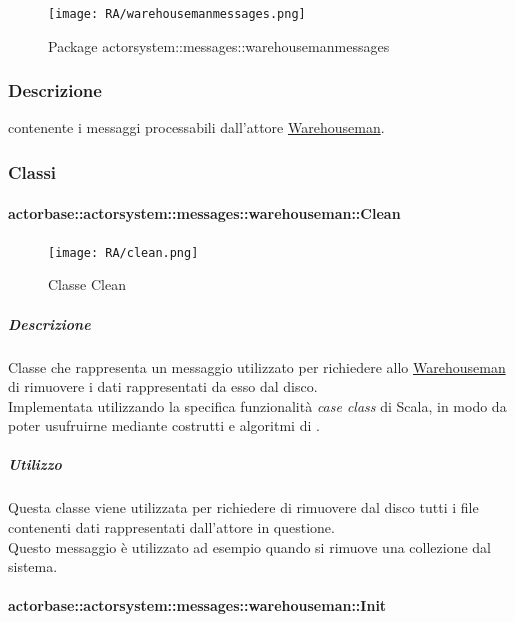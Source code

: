 \documentclass{scalatekids-article}
\begin{document}
\begin{figure}[H]
  \begin{center}
    \texttt{[image: RA/warehousemanmessages.png]}
    \caption{Package actorsystem::messages::warehousemanmessages}
  \end{center}
\end{figure}

\subsubsection{Descrizione}
 contenente i messaggi processabili dall'attore \hyperref[sec:actorbase::actorsystem::actors::warehouseman::Warehouseman]{Warehouseman}.

\subsubsection{Classi}

\paragraph{actorbase::actorsystem::messages::warehouseman::Clean}
\label{sec:actorbase::actorsystem::messages::warehouseman::Clean}

\begin{figure}[H]
  \begin{center}
    \texttt{[image: RA/clean.png]}
    \caption{Classe Clean}
  \end{center}
\end{figure}

\subparagraph{Descrizione}
Classe che rappresenta un messaggio utilizzato per richiedere allo
\hyperref[sec:actorbase::actorsystem::actors::warehouseman::Warehouseman]{Warehouseman} di rimuovere i dati rappresentati da esso dal disco.\\Implementata utilizzando la specifica funzionalità \textit{case class} di Scala,
in modo da poter usufruirne mediante costrutti e algoritmi di
.

\subparagraph{Utilizzo}
Questa classe viene utilizzata per richiedere di rimuovere dal disco tutti i
file contenenti dati rappresentati dall'attore in questione.\\Questo messaggio
è utilizzato ad esempio quando si rimuove una collezione dal sistema.

\paragraph{actorbase::actorsystem::messages::warehouseman::Init}
\label{sec:actorbase::actorsystem::messages::warehouseman::Init}
\end{document}

